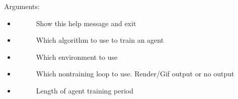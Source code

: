 \documentclass[letterpaper,10pt,english]{sphinxmanual}
\begin{document}
\sphinxAtStartPar
Arguments:
\begin{itemize}
\item {} \begin{description}
\item[{}] \leavevmode
\sphinxAtStartPar
Show this help message and exit

\end{description}

\item {} \begin{description}
\item[{}] \leavevmode
\sphinxAtStartPar
Which algorithm to use to train an agent

\end{description}

\item {} \begin{description}
\item[{}] \leavevmode
\sphinxAtStartPar
Which environment to use

\end{description}

\item {} \begin{description}
\item[{}] \leavevmode
\sphinxAtStartPar
Which non\sphinxhyphen{}training loop to use. Render/Gif output or no output

\end{description}

\item {} \begin{description}
\item[{}] \leavevmode
\sphinxAtStartPar
Length of agent training period


\end{description}
\end{itemize}
\end{document}
